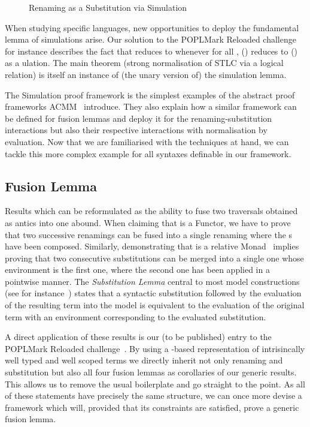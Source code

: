 \begin{figure}[h]
\caption{Renaming as a Substitution via Simulation}
\end{figure}

When studying specific languages, new opportunities to deploy the
fundamental lemma of simulations arise. Our solution to the POPLMark
Reloaded challenge for instance describes the fact that { \AB{$\rho$} }
reduces to {  } whenever for all ,
\AB{$\rho$}() reduces to () as a ulation.
The main theorem (strong normalisation of STLC via a logical relation)
is itself an instance of (the unary version of) the simulation lemma.

The Simulation proof framework is the simplest examples of the abstract
proof frameworks ACMM~\citeyear{allais2017type} introduce. They also
explain how a similar framework can be defined
for fusion lemmas and deploy it for the renaming-substitution interactions
but also their respective interactions with normalisation by evaluation.
Now that we are familiarised with the techniques at hand, we can tackle
this more complex example for all syntaxes definable in our framework.



\subsection{Fusion Lemma}\label{section:fusion}

Results which can be reformulated as the ability to fuse two traversals
obtained as antics into one abound. When claiming that  is
a Functor, we have to prove that two successive renamings can be fused into
a single renaming where the s have been composed. Similarly,
demonstrating that  is a relative Monad~\cite{JFR4389} implies proving
that two consecutive substitutions can be merged into a single one whose
environment is the first one, where the second one has been applied in a
pointwise manner. The \emph{Substitution Lemma} central
to most model constructions (see for instance~\cite{mitchell1991kripke}) states
that a syntactic substitution followed by the evaluation of the resulting term
into the model is equivalent to the evaluation of the original term with an
environment corresponding to the evaluated substitution.

A direct application of these results is our (to be published) entry to the
POPLMark Reloaded challenge~\citeyear{poplmarkreloaded}. By using a -based
representation of intrisincally well typed and well scoped terms we directly inherit
not only renaming and substitution but also all four fusion lemmas as corollaries
of our generic results. This allows us to remove the usual boilerplate
and go straight to the point.
As all of these statements have precisely the same structure, we can
once more devise a framework which will, provided that its constraints are
satisfied, prove a generic fusion lemma.

